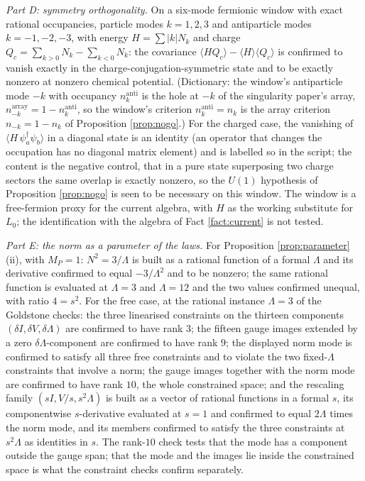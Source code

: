 \documentclass[11pt]{article}
\theoremstyle{definition}
\begin{document}
\emph{Part D: symmetry orthogonality.} On a six-mode fermionic window with exact rational occupancies, particle modes $k = 1,2,3$ and antiparticle modes $k = -1,-2,-3$, with energy $H = \sum |k| N_k$ and charge $Q_c = \sum_{k>0}N_k - \sum_{k<0}N_k$: the covariance $\langle HQ_c\rangle - \langle H\rangle\langle Q_c\rangle$ is confirmed to vanish exactly in the charge-conjugation-symmetric state and to be exactly nonzero at nonzero chemical potential. (Dictionary: the window's antiparticle mode $-k$ with occupancy $n^{\mathrm{anti}}_{k}$ is the hole at $-k$ of the singularity paper's array, $n^{\mathrm{array}}_{-k} = 1 - n^{\mathrm{anti}}_k$, so the window's criterion $n^{\mathrm{anti}}_k = n_k$ is the array criterion $n_{-k} = 1 - n_k$ of Proposition \ref{prop:nogo}.) For the charged case, the vanishing of $\langle H\,\psi^\dagger_a\psi_b\rangle$ in a diagonal state is an identity (an operator that changes the occupation has no diagonal matrix element) and is labelled so in the script; the content is the negative control, that in a pure state superposing two charge sectors the same overlap is exactly nonzero, so the $U(1)$ hypothesis of Proposition \ref{prop:nogo} is seen to be necessary on this window. The window is a free-fermion proxy for the current algebra, with $H$ as the working substitute for $L_0$; the identification with the algebra of Fact \ref{fact:current} is not tested.

\emph{Part E: the norm as a parameter of the laws.} For Proposition \ref{prop:parameter}(ii), with $M_P = 1$: $N^2 = 3/\Lambda$ is built as a rational function of a formal $\Lambda$ and its derivative confirmed to equal $-3/\Lambda^2$ and to be nonzero; the same rational function is evaluated at $\Lambda = 3$ and $\Lambda = 12$ and the two values confirmed unequal, with ratio $4 = s^2$. For the free case, at the rational instance $\Lambda = 3$ of the Goldstone checks: the three linearised constraints on the thirteen components $(\delta I, \delta V, \delta\Lambda)$ are confirmed to have rank $3$; the fifteen gauge images extended by a zero $\delta\Lambda$-component are confirmed to have rank $9$; the displayed norm mode is confirmed to satisfy all three free constraints and to violate the two fixed-$\Lambda$ constraints that involve a norm; the gauge images together with the norm mode are confirmed to have rank $10$, the whole constrained space; and the rescaling family $(sI, V/s, s^2\Lambda)$ is built as a vector of rational functions in a formal $s$, its componentwise $s$-derivative evaluated at $s = 1$ and confirmed to equal $2\Lambda$ times the norm mode, and its members confirmed to satisfy the three constraints at $s^2\Lambda$ as identities in $s$. The rank-$10$ check tests that the mode has a component outside the gauge span; that the mode and the images lie inside the constrained space is what the constraint checks confirm separately.
\end{document}
